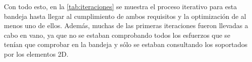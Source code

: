 Con todo esto, en la \autoref{tab:iteraciones} se muestra el proceso iterativo para esta bandeja hasta llegar al cumplimiento de ambos requisitos y la optimización de al menos uno de ellos. Además, muchas de las primeras iteraciones fueron llevadas a cabo en vano, ya que no se estaban comprobando todos los esfuerzos que se tenían que comprobar en la bandeja y sólo se estaban consultando los soportados por los elementos 2D.




\begin{table}[H]
\centering
\caption{Parametros de las iteraciones de la bandeja intermedia.}
\label{tab:iteraciones}
\end{table}
